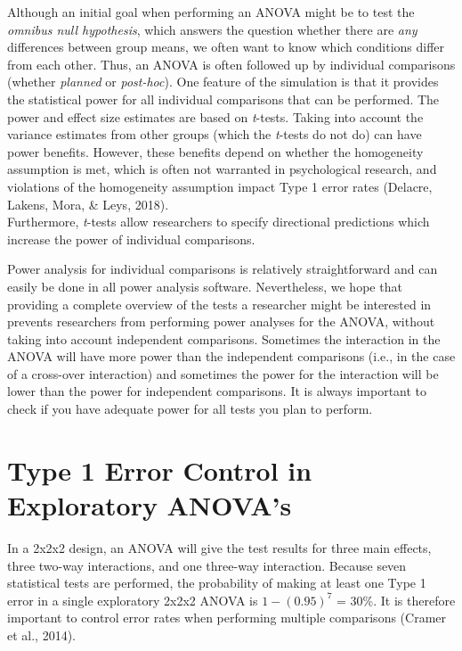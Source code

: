 \documentclass[,jou, draftfirst, a4paper,floatsintext]{apa6}
\begin{document}
Although an initial goal when performing an ANOVA might be to test the \emph{omnibus null hypothesis}, which answers the question whether there are \emph{any} differences between group means, we often want to know which conditions differ from each other. Thus, an ANOVA is often followed up by individual comparisons (whether \emph{planned} or \emph{post-hoc}).
One feature of the simulation is that it provides the statistical power for all individual comparisons that can be performed.
The power and effect size estimates are based on \emph{t}-tests.
Taking into account the variance estimates from other groups (which the \emph{t}-tests do not do) can have power benefits.
However, these benefits depend on whether the homogeneity assumption is met, which is often not warranted in psychological research, and violations of the homogeneity assumption impact Type 1 error rates (Delacre, Lakens, Mora, \& Leys, 2018).\\
Furthermore, \emph{t}-tests allow researchers to specify directional predictions which increase the power of individual comparisons.

Power analysis for individual comparisons is relatively straightforward and can easily be done in all power analysis software.
Nevertheless, we hope that providing a complete overview of the tests a researcher might be interested in prevents researchers from performing power analyses for the ANOVA, without taking into account independent comparisons.
Sometimes the interaction in the ANOVA will have more power than the independent comparisons (i.e., in the case of a cross-over interaction) and sometimes the power for the interaction will be lower than the power for independent comparisons.
It is always important to check if you have adequate power for all tests you plan to perform.

\hypertarget{type-1-error-control-in-exploratory-anovas}{%
\section{Type 1 Error Control in Exploratory ANOVA's}\label{type-1-error-control-in-exploratory-anovas}}

In a 2x2x2 design, an ANOVA will give the test results for three main effects, three two-way interactions, and one three-way interaction.
Because seven statistical tests are performed, the probability of making at least one Type 1 error in a single exploratory 2x2x2 ANOVA is \(1-(0.95)^7\) = 30\%.
It is therefore important to control error rates when performing multiple comparisons (Cramer et al., 2014).
\end{document}
